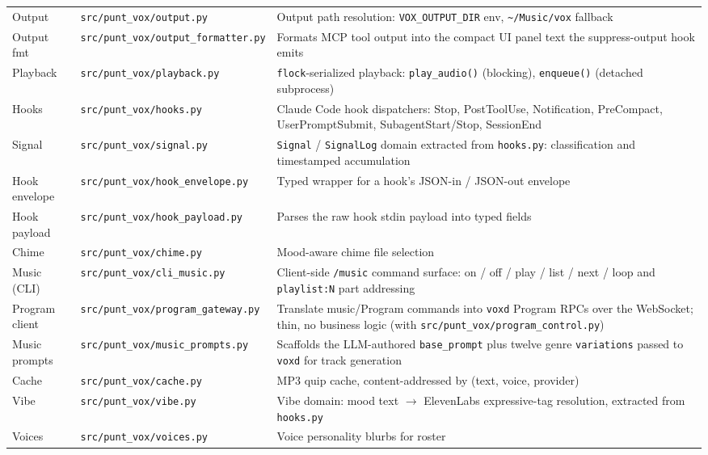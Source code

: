 \documentclass[a4paper,10pt]{article}
\newcommand{\modpath}[1]{\texttt{src/punt\_vox/#1}}
\newcommand{\cmd}[1]{\texttt{/#1}}
\begin{document}
\begin{center}
\begin{longtable}{llp{6.2cm}}
Output     & \modpath{output.py}     & Output path resolution:
             \texttt{VOX\_OUTPUT\_DIR} env, \texttt{\~{}/Music/vox}
             fallback \\
Output fmt & \modpath{output\_formatter.py} & Formats MCP tool output
             into the compact UI panel text the suppress-output hook emits \\
Playback   & \modpath{playback.py}   & \texttt{flock}-serialized playback:
             \texttt{play\_audio()} (blocking),
             \texttt{enqueue()} (detached subprocess) \\
Hooks      & \modpath{hooks.py}      & Claude Code hook dispatchers: Stop,
             PostToolUse, Notification, PreCompact,
             UserPromptSubmit, SubagentStart/Stop, SessionEnd \\
Signal     & \modpath{signal.py}     & \texttt{Signal} / \texttt{SignalLog}
             domain extracted from \texttt{hooks.py}: classification and
             timestamped accumulation \\
Hook envelope & \modpath{hook\_envelope.py} & Typed wrapper for a hook's
             JSON-in / JSON-out envelope \\
Hook payload & \modpath{hook\_payload.py} & Parses the raw hook stdin
             payload into typed fields \\
Chime      & \modpath{chime.py}      & Mood-aware chime file selection \\
Music (CLI) & \modpath{cli\_music.py}  & Client-side \cmd{music} command
             surface: on / off / play / list / next / loop and
             \texttt{playlist:N} part addressing \\
Program client & \modpath{program\_gateway.py} & Translate music/Program
             commands into \texttt{voxd} Program RPCs over the WebSocket;
             thin, no business logic (with \modpath{program\_control.py}) \\
Music prompts & \modpath{music\_prompts.py} & Scaffolds the LLM-authored
             \texttt{base\_prompt} plus twelve genre \texttt{variations}
             passed to \texttt{voxd} for track generation \\
Cache      & \modpath{cache.py}      & MP3 quip cache, content-addressed
             by (text, voice, provider) \\
Vibe       & \modpath{vibe.py}       & Vibe domain: mood text $\to$
             ElevenLabs expressive-tag resolution, extracted from
             \texttt{hooks.py} \\
Voices     & \modpath{voices.py}     & Voice personality blurbs for roster

\end{longtable}
\end{center}
\end{document}
